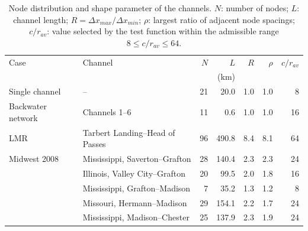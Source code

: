 \begin{table}[htbp]
\caption{Node distribution and shape parameter of the channels. $N$: number of nodes; $L$: channel length; $R=\Delta x_{max}/\Delta x_{min}$; $\rho$: largest ratio of adjacent node spacings; $c/r_{av}$: value selected by the test function within the admissible range $8\leq c/r_{av}\leq 64$.}
\label{tab:shape}
\centering
\small
\setlength{\tabcolsep}{4pt}
\begin{tabular}{llrrrrr}
\toprule
Case & Channel & $N$ & $L$ & $R$ & $\rho$ & $c/r_{av}$ \\
 & & & (km) & & & \\
\midrule
Single channel & -- & 21 & 20.0 & 1.0 & 1.0 & 8 \\
\midrule
Backwater network & Channels 1--6 & 11 & 0.6 & 1.0 & 1.0 & 16 \\
\midrule
LMR & Tarbert Landing--Head of Passes & 96 & 490.8 & 8.4 & 8.1 & 64 \\
\midrule
Midwest 2008 & Mississippi, Saverton--Grafton & 28 & 140.4 & 2.3 & 2.3 & 24 \\
 & Illinois, Valley City--Grafton & 20 & 99.5 & 2.0 & 1.8 & 16 \\
 & Mississippi, Grafton--Madison & 7 & 35.2 & 1.3 & 1.2 & 8 \\
 & Missouri, Hermann--Madison & 29 & 154.1 & 2.2 & 1.7 & 24 \\
 & Mississippi, Madison--Chester & 25 & 137.9 & 2.3 & 1.9 & 24 \\
\bottomrule
\end{tabular}
\end{table}
